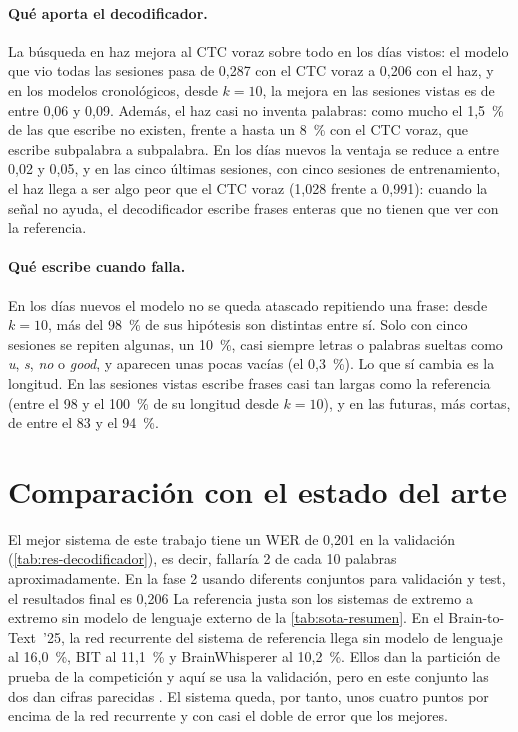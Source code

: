 \paragraph{Qué aporta el decodificador.} La búsqueda en haz mejora al CTC voraz sobre todo en los días vistos: el modelo que vio todas las sesiones pasa de 0,287 con el CTC voraz a 0,206 con el haz, y en los modelos cronológicos, desde $k = 10$, la mejora en las sesiones vistas es de entre 0,06 y 0,09. Además, el haz casi no inventa palabras: como mucho el 1,5~\% de las que escribe no existen, frente a hasta un 8~\% con el CTC voraz, que escribe subpalabra a subpalabra. En los días nuevos la ventaja se reduce a entre 0,02 y 0,05, y en las cinco últimas sesiones, con cinco sesiones de entrenamiento, el haz llega a ser algo peor que el CTC voraz (1,028 frente a 0,991): cuando la señal no ayuda, el decodificador escribe frases enteras que no tienen que ver con la referencia.

\paragraph{Qué escribe cuando falla.} En los días nuevos el modelo no se queda atascado repitiendo una frase: desde $k = 10$, más del 98~\% de sus hipótesis son distintas entre sí. Solo con cinco sesiones se repiten algunas, un 10~\%, casi siempre letras o palabras sueltas como \textit{u}, \textit{s}, \textit{no} o \textit{good}, y aparecen unas pocas vacías (el 0,3~\%). Lo que sí cambia es la longitud. En las sesiones vistas escribe frases casi tan largas como la referencia (entre el 98 y el 100~\% de su longitud desde $k = 10$), y en las futuras, más cortas, de entre el 83 y el 94~\%.

\section{Comparación con el estado del arte}
\label{sec:res-sota}

El mejor sistema de este trabajo tiene un WER de 0,201 en la validación (\cref{tab:res-decodificador}), es decir, fallaría 2 de cada 10 palabras aproximadamente. En la fase 2 usando diferents conjuntos para validación y test, el resultados final es 0,206 La referencia justa son los sistemas de extremo a extremo sin modelo de lenguaje externo de la \cref{tab:sota-resumen}. En el Brain-to-Text~'25, la red recurrente del sistema de referencia llega sin modelo de lenguaje al 16,0~\%, BIT al 11,1~\% y BrainWhisperer al 10,2~\%. Ellos dan la partición de prueba de la competición y aquí se usa la validación, pero en este conjunto las dos dan cifras parecidas \cite{lightbeam}. El sistema queda, por tanto, unos cuatro puntos por encima de la red recurrente y con casi el doble de error que los mejores.


